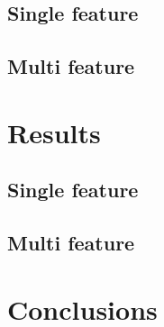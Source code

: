 \subsection{Single feature}
\subsection{Multi feature}

\section{Results}
\subsection{Single feature}
\subsection{Multi feature}

\section{Conclusions}
